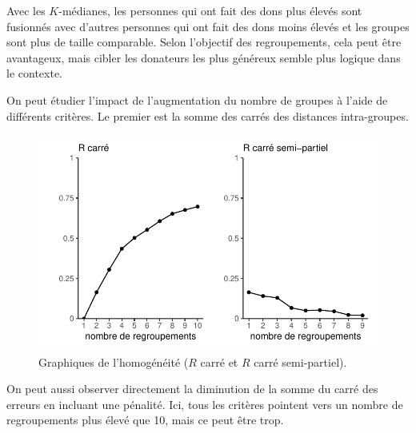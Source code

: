\documentclass[
  11pt,
  letterpaper,
]{scrbook}
\newenvironment{Shaded}{\begin{snugshade}}{\end{snugshade}}
\newcommand{\CommentTok}[1]{\textcolor[rgb]{0.37,0.37,0.37}{#1}}
\newcommand{\ControlFlowTok}[1]{\textcolor[rgb]{0.00,0.23,0.31}{#1}}
\newcommand{\FunctionTok}[1]{\textcolor[rgb]{0.28,0.35,0.67}{#1}}
\newcommand{\NormalTok}[1]{\textcolor[rgb]{0.00,0.23,0.31}{#1}}
\newcommand{\OtherTok}[1]{\textcolor[rgb]{0.00,0.23,0.31}{#1}}
\newcommand{\SpecialCharTok}[1]{\textcolor[rgb]{0.37,0.37,0.37}{#1}}
\theoremstyle{definition}
\theoremstyle{remark}
\begin{document}
Avec les \(K\)-médianes, les personnes qui ont fait des dons plus élevés
sont fusionnés avec d'autres personnes qui ont fait des dons moins
élevés et les groupes sont plus de taille comparable. Selon l'objectif
des regroupements, cela peut être avantageux, mais cibler les donateurs
les plus généreux semble plus logique dans le contexte.

On peut étudier l'impact de l'augmentation du nombre de groupes à l'aide
de différents critères. Le premier est la somme des carrés des distances
intra-groupes.

\begin{Shaded}
\end{Shaded}

\begin{figure}[ht!]

{\centering \includegraphics{./03-regroupements_files/figure-pdf/fig-homogeneite-1.pdf}

}

\caption{\label{fig-homogeneite}Graphiques de l'homogénéité (\(R\) carré
et \(R\) carré semi-partiel).}

\end{figure}

On peut aussi observer directement la diminution de la somme du carré
des erreurs en incluant une pénalité. Ici, tous les critères pointent
vers un nombre de regroupements plus élevé que 10, mais ce peut être
trop.
\end{document}
